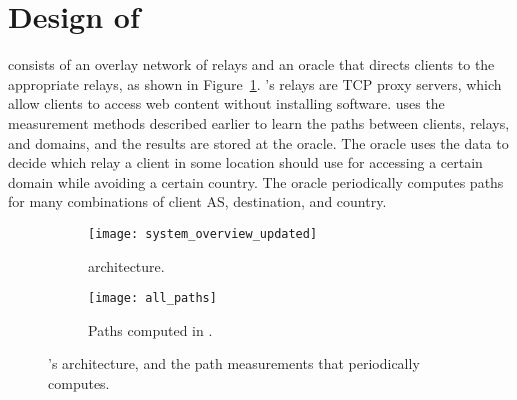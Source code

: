 \section{Design of \system{}}
\label{system_design}

\system{} consists of an overlay network of relays and an oracle that
directs clients to the appropriate relays, as shown in
Figure~\ref{fig:arch}.  \system{}'s relays are TCP proxy servers,
which allow clients to access web content without installing software.
\system{} uses the
measurement methods described earlier to learn the paths between
clients, relays, and domains, and the results are stored at the
oracle.  The oracle uses the data to decide which relay a client in
some location should use for accessing a certain domain while avoiding
a certain country.  The oracle periodically computes paths for many
combinations of client AS, destination, and country.
%



\begin{figure*}[t!]
    \centering
    \begin{subfigure}[b]{0.4\textwidth}
        \texttt{[image: system\_overview\_updated]}
        \caption{\system{} architecture.}
        \label{fig:arch}
    \end{subfigure}
    \begin{subfigure}[b]{0.4\textwidth}
        \texttt{[image: all\_paths]}
        \caption{Paths computed in \system{}.}
        \label{fig:paths}
    \end{subfigure}
    \caption{\system{}'s architecture, and the path
      measurements that \system{} periodically computes.}
\end{figure*}

